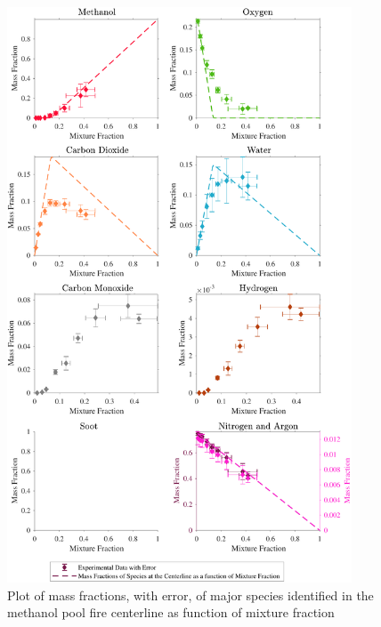 \documentclass[12pt]{article}
\begin{document}
\begin{figure}[!h]
	\centering
\includegraphics[width=10.25cm,keepaspectratio]{Methanol_Mixture_Fraction_Major_Plot.pdf}
	\caption[Species mass fractions superimposed on methanol state relations]{Plot of mass fractions, with error, of major species identified in the methanol pool fire centerline as function of mixture fraction}
	\label{fig:Methanol_MIX_Frac_Major}
\end{figure}

\pagebreak
\end{document}
